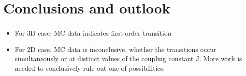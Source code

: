 \documentclass{beamer}
\begin{document}
\section{Conclusions and outlook}
\begin{frame}
	\frametitle{\insertsection}
	\framesubtitle{\insertsubsection}
	\begin{itemize}
		\item For 3D case, MC data indicates first-order transition 
		\item  For 2D case, MC data is inconclusive, whether the transitions occur simultaneously or at distinct values of the coupling constant J. More work is needed to conclusively rule out one of possibilities. 
		 
	\end{itemize}
	\begin{figure}[b]
		\centering
		\scriptsize {\par { \scriptsize{    }} } 
		\label{ph}
	\end{figure}
	
\end{frame}
\end{document}
